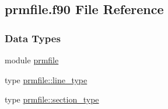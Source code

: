\hypertarget{prmfile_8f90}{\subsection{prmfile.\-f90 File Reference}
\label{prmfile_8f90}
}
\subsubsection*{Data Types}
\begin{DoxyCompactItemize}
\item 
module \hyperlink{classprmfile}{prmfile}
\item 
type \hyperlink{structprmfile_1_1line__type}{prmfile\-::line\-\_\-type}
\item 
type \hyperlink{structprmfile_1_1section__type}{prmfile\-::section\-\_\-type}
\end{DoxyCompactItemize}
